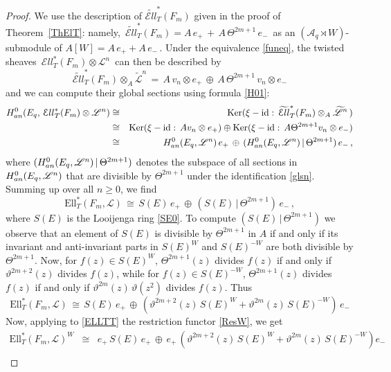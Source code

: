\documentclass[11pt]{amsart}
\theoremstyle{definition}
\theoremstyle{remark}
\numberwithin{equation}{section}
\newcommand{\la}{\label}
\newcommand{\Ker}{\mathrm{Ker}}
\newcommand{\id}{\mathrm{id}}
\def\A{\mathcal{A}}
\def\cL{\mathscr{
L}}
\def\Ell{\mathcal{E}{ll}}
\def\ELL{\mathrm{Ell}}
\begin{document}
\begin{proof}
We use the description of $ \widetilde{\Ell}_T^*(F_m) $ given in the proof of Theorem~\ref{ThElT}: namely, $\, \widetilde{\Ell}_T^*(F_m) = A\,e_+ \,+\,A \,\Theta^{2m+1}\, e_{-} \,$ as an $ (\A_q\rtimes W) $-submodule of  $ A[W] = A\,e_+ + A\,e_{-}  \,$. Under the equivalence \eqref{funeq}, the twisted sheaves $\,\Ell_T^*(F_m) \otimes \cL^n \,$ can then be described by
%
\begin{equation}\la{Elln}
\widetilde{\Ell}_T^*(F_m) \otimes_A \widetilde{\cL}^n \,=\, A\, v_n \otimes e_+ \,\oplus\, A \,\Theta^{2m+1}\, v_n\otimes e_{-} 
\end{equation}
%
and we can compute their global sections using formula \eqref{H01}: 
%
\begin{eqnarray*}\la{HH0}
H^0_{\rm an}(E_q,\, \Ell_T^*(F_m) \otimes \cL^n) &\cong& \Ker(\xi-\id:\,\widetilde{\Ell}_T^*(F_m) \otimes_A \widetilde{\cL}^n\,)\\
& \cong & \Ker(\xi- \id:\, A v_n \otimes e_+) \oplus \Ker(\xi-\id:\, A \Theta^{2m+1} v_n \otimes e_-)\\
&\cong& H^0_{\rm an}(E_q, \cL^n)\,e_+ \,\oplus\, 
(H^0_{\rm an}(E_q, \cL^n)\,|\, \Theta^{2m+1}) \, e_{-}\,,
\end{eqnarray*}
%
where $ (H^0_{\rm an}(E_q, \cL^n)\,|\, \Theta^{2m+1}) $ denotes the subspace of all sections in
$ H^0_{\rm an}(E_q, \cL^n) $ that are divisible by $ \Theta^{2m+1} $  under the identification \eqref{glsn}. Summing up over all $ n\ge 0 $, we find 
%
$$ 
\ELL_T^*(F_m, \cL) \,\cong\, S(E)\,e_+ \,\oplus\, (S(E)\,|\,\Theta^{2m+1})\, e_{-}\,,
$$
%
where $S(E)$ is the Looijenga ring \eqref{SE0}. To compute $(S(E)\,|\,\Theta^{2m+1})$ we observe that
an element of $ S(E) $ is divisible by $\Theta^{2m+1}$ in $A$ if and only if its invariant
and anti-invariant parts in $S(E)^W$ and $S(E)^{-W}$ are both divisible by
$\Theta^{2m+1}$. Now, for $ f(z) \in S(E)^W$, $\Theta^{2m+1}(z)$ divides $f(z)$ if and only if $\vartheta^{2m+2}(z)$ divides $f(z)$, while for $ f(z) \in S(E)^{-W}$, $\Theta^{2m+1}(z)$ divides $f(z)$ if and only if $\vartheta^{2m}(z)\,\vartheta(z^2)$ divides $f(z)$. Thus
%
\begin{equation}
\la{ELLTT}
\ELL_T^*(F_m, \cL) \,\cong\, S(E)\,e_+ \,\oplus\,(\vartheta^{2m+2}(z)\, S(E)^W +  \vartheta^{2m}(z)\,S(E)^{-W})\,e_{-} 
\end{equation}
%
Now, applying to \eqref{ELLTT} the restriction functor \eqref{ResW}, we get 
%
\begin{eqnarray*}
\ELL_T^*(F_m, \cL)^W & \cong & 
e_{+}\,S(E)\,e_+ \,\oplus \,e_+\,\left(\vartheta^{2m+2}(z)\,S(E)^W  + \vartheta^{2m}(z)\,S(E)^{-W}\right) e_{-}\\

\end{eqnarray*}
\end{proof}
\end{document}
